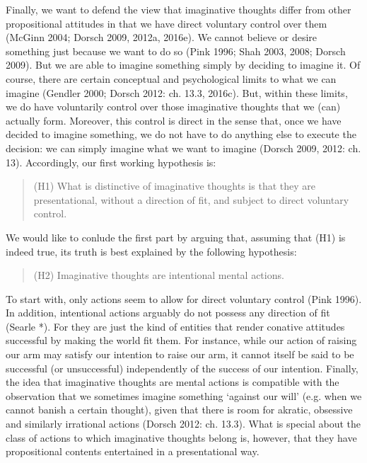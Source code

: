 Finally, we want to defend the view that imaginative thoughts differ from other propositional attitudes in that we have direct voluntary control over them (McGinn 2004; Dorsch 2009, 2012a, 2016e). We cannot believe or desire something just because we want to do so (Pink 1996; Shah 2003, 2008; Dorsch 2009). But we are able to imagine something simply by deciding to imagine it. Of course, there are certain conceptual and psychological limits to what we can imagine (Gendler 2000; Dorsch 2012: ch. 13.3, 2016c). But, within these limits, we do have voluntarily control over those imaginative thoughts that we (can) actually form. Moreover, this control is direct in the sense that, once we have decided to imagine something, we do not have to do anything else to execute the decision: we can simply imagine what we want to imagine (Dorsch 2009, 2012: ch. 13). Accordingly, our first working hypothesis is:

\vspace{-.2cm}
\begin{quote}
(H1) What is distinctive of imaginative thoughts is that they are presentational, without a direction of fit, and subject to direct
voluntary control.
\end{quote}
\vspace{-.2cm}

\noindent We would like to conlude the first part by arguing that, assuming that (H1) is indeed true, its truth is best explained by the
following hypothesis:

\vspace{-.2cm}
\begin{quote}
(H2) Imaginative thoughts are intentional mental actions.
\end{quote}
\vspace{-.2cm}

\noindent To start with, only actions seem to allow for direct voluntary control (Pink 1996). In addition, intentional actions arguably do not possess any direction of fit (Searle *). For they are just the kind of entities that render conative attitudes successful by making the world fit them. For instance, while our action of raising our arm may satisfy our intention to raise our arm, it cannot itself be said to be successful (or unsuccessful) independently of the success of our intention. Finally, the idea that imaginative thoughts are mental actions is compatible with the observation that we sometimes imagine something `against our will' (e.g. when we cannot banish a certain thought), given that there is room for akratic, obsessive and similarly irrational actions (Dorsch 2012: ch. 13.3). What is special about the class of actions to which imaginative thoughts belong is, however, that they have propositional contents entertained in a presentational way.

